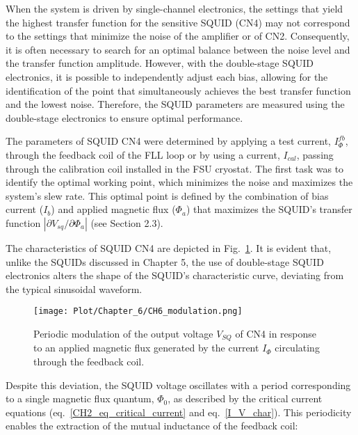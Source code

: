 \documentclass[12pt,a4paper]{report}
\begin{document}
        When the system is driven by single-channel electronics, the settings that yield the highest transfer function for the sensitive SQUID (CN4) may not correspond to the settings that minimize the noise of the amplifier or of CN2. Consequently, it is often necessary to search for an optimal balance between the noise level and the transfer function amplitude. However, with the double-stage SQUID electronics, it is possible to independently adjust each bias, allowing for the identification of the point that simultaneously achieves the best transfer function and the lowest noise. Therefore, the SQUID parameters are measured using the double-stage electronics to ensure optimal performance.
        
        
        The parameters of SQUID CN4 were determined by applying a test current, $I_\Phi^{fb}$, through the feedback coil of the FLL loop or by using a current, $I_{cal}$, passing through the calibration coil installed in the FSU cryostat. The first task was to identify the optimal working point, which minimizes the noise and maximizes the system's slew rate. This optimal point is defined by the combination of bias current ($I_b$) and applied magnetic flux ($\Phi_a$) that maximizes the SQUID's transfer function $|\partial V_{sq}/\partial\Phi_a|$ (see Section 2.3).
        
        The characteristics of SQUID CN4 are depicted in Fig.~\ref{CH6_modulation}. It is evident that, unlike the SQUIDs discussed in Chapter 5, the use of double-stage SQUID electronics alters the shape of the SQUID's characteristic curve, deviating from the typical sinusoidal waveform.
        
        \begin{figure}[H]
        	\centering
        	\texttt{[image: Plot/Chapter\_6/CH6\_modulation.png]}
        	\caption{\small{Periodic modulation of the output voltage $V_{SQ}$ of CN4 in response to an applied magnetic flux generated by the current $I_{\Phi}$ circulating through the feedback coil.}}
        	\label{CH6_modulation}
        \end{figure}
        
        Despite this deviation, the SQUID voltage oscillates with a period corresponding to a single magnetic flux quantum, $\Phi_0$, as described by the critical current equations (eq.~\ref{CH2_eq_critical_current} and eq.~\ref{I_V_char}). This periodicity enables the extraction of the mutual inductance of the feedback coil:
        
\end{document}
